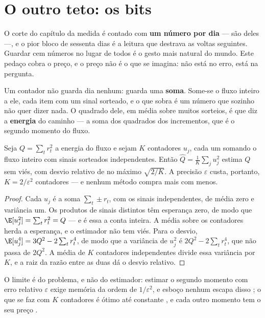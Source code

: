 \section{O outro teto: os bits}

O corte do capítulo da medida é contado com \textbf{um número por dia} --- são \numSerieDias{} deles ---,
e o pior bloco de sessenta dias é a leitura que destrava as voltas seguintes. Guardar cem números no
lugar de todos é o gesto mais natural do mundo. Este pedaço cobra o preço, e o preço não é o que se
imagina: não está no erro, está na pergunta.

Um contador não guarda dia nenhum: guarda uma \textbf{soma}. Some-se o fluxo inteiro a ele, cada
item com um sinal sorteado, e o que sobra é um número que sozinho não quer dizer nada. O quadrado
dele, em média sobre muitos sorteios, é que diz a \textbf{energia} do caminho --- a soma dos
quadrados dos incrementos, que é o segundo momento do fluxo.

\begin{proposicao}\label{prop:preco-do-resumo}
Seja $Q = \sum_t r_t^2$ a energia do fluxo e sejam $K$ contadores $u_j$, cada um somando o fluxo
inteiro com sinais sorteados independentes. Então $\hat Q = \frac{1}{K}\sum_j u_j^2$ estima $Q$ sem
viés, com desvio relativo de no máximo $\sqrt{2/K}$. A precisão $\varepsilon$ custa, portanto,
$K = 2/\varepsilon^2$ contadores --- e nenhum método compra mais com menos.
\end{proposicao}

\begin{proof}
Cada $u_j$ é a soma $\sum_t \pm r_t$, com os sinais independentes, de média zero e variância um.
Os produtos de sinais distintos têm esperança zero, de modo que $\E[u_j^2] = \sum_t r_t^2 = Q$ --- e
é essa a conta inteira. A média sobre os contadores herda a esperança, e o estimador não tem viés.
Para o desvio, $\E[u_j^4] = 3Q^2 - 2\sum_t r_t^4$, de modo que a variância de $u_j^2$ é
$2Q^2 - 2\sum_t r_t^4$, que não passa de $2Q^2$. A média de $K$ contadores independentes divide
essa variância por $K$, e a raiz da razão entre as duas dá o desvio relativo.
\end{proof}

O limite é do problema, e não do estimador: estimar o segundo momento com erro relativo
$\varepsilon$ exige memória da ordem de $1/\varepsilon^2$, e esboço nenhum escapa disso
\cite{alon1999space}; o que se faz com $K$ contadores é ótimo até constante \cite{indyk2005optimal},
e cada outro momento tem o seu preço \cite{woodruff2004optimal}.

